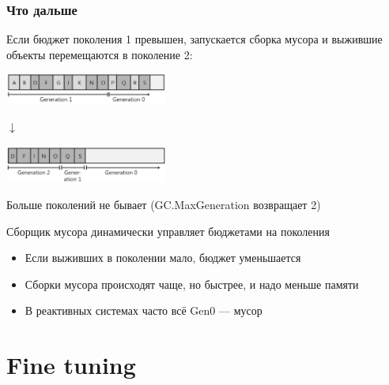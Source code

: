 \documentclass[xetex,mathserif,serif]{beamer}
\begin{document}
    \begin{frame}
        \frametitle{Что дальше}
        Если бюджет поколения 1 превышен, запускается сборка мусора и выжившие объекты перемещаются в поколение 2:
        \begin{center}
            \includegraphics[width=0.4\textwidth]{generation1full.png}
        \end{center}
        
        \vspace{-7mm}
        
        \begin{center}\begin{LARGE}$\downarrow$\end{LARGE}\end{center}
    
        \vspace{-7mm}
    
        \begin{center}
            \includegraphics[width=0.4\textwidth]{generation2.png}
        \end{center}
        Больше поколений не бывает (GC.MaxGeneration возвращает 2)

        Сборщик мусора динамически управляет бюджетами на поколения
        \begin{itemize}
            \item Если выживших в поколении мало, бюджет уменьшается
            \item Сборки мусора происходят чаще, но быстрее, и надо меньше памяти
            \item В реактивных системах часто всё Gen0 --- мусор
        \end{itemize}
    \end{frame}

    \section{Fine tuning}
\end{document}

